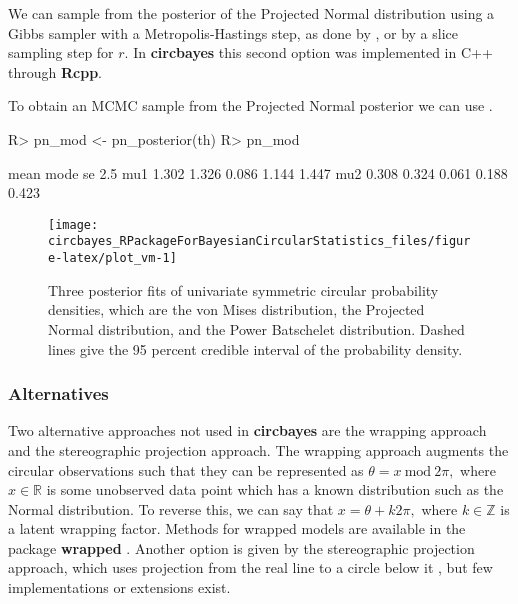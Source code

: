 \documentclass{article}
\newcommand{\code}[1]{\texttt{\detokenize{#1}}}
\let\proglang=\textsf
\newcommand{\pkg}[1]{\textbf{#1}}
\newenvironment{CodeChunk}{}{}
\begin{document}
We can sample from the posterior of the Projected Normal distribution
using a Gibbs sampler \citep{chib1995understanding} with a
Metropolis-Hastings \citep{metropolis1953equation, hastings1970monte}
step, as done by \citet{Nunez-Antonio2005}, or by a slice sampling
\citep{hernandez2017general} step for \(r\). In \pkg{circbayes} this
second option was implemented in \proglang{C++} through \pkg{Rcpp}.

To obtain an MCMC sample from the Projected Normal posterior we can use
\code{pn_posterior}.

\begin{CodeChunk}
	
	\begin{CodeInput}
		R> pn_mod <- pn_posterior(th)
		R> pn_mod 
	\end{CodeInput}
	
	\begin{CodeOutput}
		mean  mode    se  2.5%
		mu1 1.302 1.326 0.086 1.144 1.447
		mu2 0.308 0.324 0.061 0.188 0.423
	\end{CodeOutput}
\end{CodeChunk}

\begin{CodeChunk}
	\begin{figure}
		
		{\centering \texttt{[image: circbayes\_RPackageForBayesianCircularStatistics\_files/figure-latex/plot\_vm-1]} 
			
		}
		
		\caption[Three posterior fits of univariate symmetric circular probability densities, which are the von Mises distribution, the Projected Normal distribution, and the Power Batschelet distribution]{Three posterior fits of univariate symmetric circular probability densities, which are the von Mises distribution, the Projected Normal distribution, and the Power Batschelet distribution. Dashed lines give the 95 percent credible interval of the probability density.}\label{fig:plot_vm}
	\end{figure}
\end{CodeChunk}

\hypertarget{alternatives}{%
	\subsubsection{Alternatives}\label{alternatives}}

Two alternative approaches not used in \pkg{circbayes} are the wrapping
approach and the stereographic projection approach. The wrapping
approach augments the circular observations such that they can be
represented as \(\theta = x ~\text{mod} ~ 2\pi,\) where
\(x \in \mathbb{R}\) is some unobserved data point which has a known
distribution such as the Normal distribution. To reverse this, we can
say that \(x = \theta + k 2 \pi,\) where \(k \in \mathbb{Z}\) is a
latent wrapping factor. Methods for wrapped models are available in the
package \pkg{wrapped} \citep{nadarajah2017wrapped}. Another option is
given by the stereographic projection approach, which uses projection
from the real line to a circle below it \citep{abe2010symmetric}, but
few implementations or extensions exist.
\end{document}

